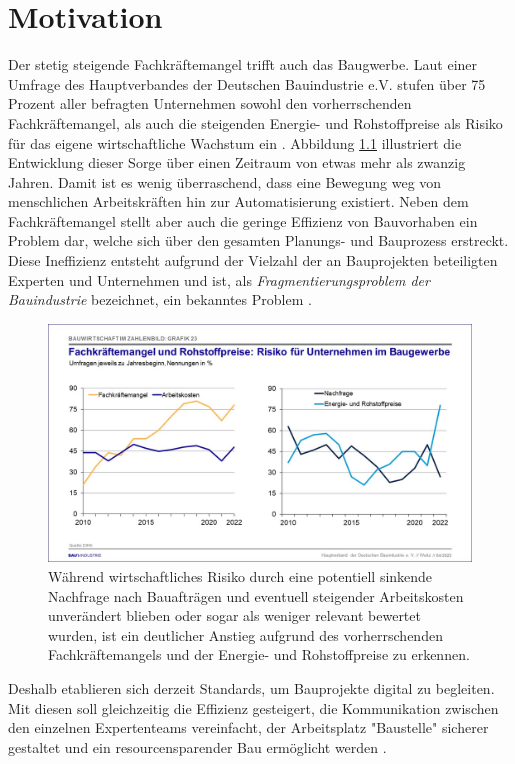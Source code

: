 \chapter{Motivation}\label{motivation}
Der stetig steigende Fachkräftemangel trifft auch das Baugwerbe. 
Laut einer Umfrage des Hauptverbandes der Deutschen Bauindustrie e.V. stufen über 75 Prozent aller befragten Unternehmen sowohl den vorherrschenden Fachkräftemangel, als auch die steigenden Energie- und Rohstoffpreise als Risiko für das eigene wirtschaftliche Wachstum ein \cite{Bauindustrie:online}.
Abbildung \ref{fig:Fachkräftemangel} illustriert die Entwicklung dieser Sorge über einen Zeitraum von etwas mehr als zwanzig Jahren.
Damit ist es wenig überraschend, dass eine Bewegung weg von menschlichen Arbeitskräften hin zur Automatisierung existiert.
Neben dem Fachkräftemangel stellt aber auch die geringe Effizienz von Bauvorhaben ein Problem dar, welche sich über den gesamten Planungs- und Bauprozess erstreckt. 
Diese Ineffizienz entsteht aufgrund der Vielzahl der an Bauprojekten beteiligten Experten und Unternehmen und ist, als \textit{Fragmentierungsproblem der Bauindustrie} bezeichnet, ein bekanntes Problem  \cite{ConstructionFragmentation}.
\begin{figure}[h]
    \centering
    \includegraphics[width=0.7\columnwidth]{fig/Grafik_23.jpg}
    \caption{Während wirtschaftliches Risiko durch eine potentiell sinkende Nachfrage nach Bauafträgen und eventuell steigender Arbeitskosten unverändert blieben oder sogar als weniger relevant bewertet wurden, ist ein deutlicher Anstieg aufgrund des vorherrschenden Fachkräftemangels und der Energie- und Rohstoffpreise zu erkennen.}
    \label{fig:Fachkräftemangel}
\end{figure}
Deshalb etablieren sich derzeit Standards, um Bauprojekte digital zu begleiten.
Mit diesen soll gleichzeitig die Effizienz gesteigert, die Kommunikation zwischen den einzelnen Expertenteams vereinfacht, der Arbeitsplatz "Baustelle" sicherer gestaltet und ein resourcensparender Bau ermöglicht werden \cite{BIMforHe12:online} \cite{Top10Ben31:online}.
